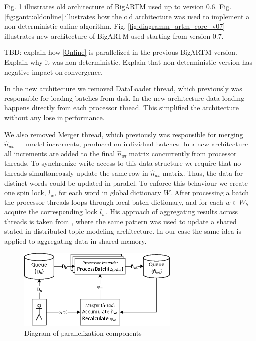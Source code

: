 \documentclass[russian,english]{llncs}
\begin{document}
Fig. \ref{fig:diagramm_artm_core} illustrates old architecture of BigARTM used up to version 0.6.
Fig. \ref{fig:gantt:oldonline} illustrates how the old architecture was used to implement a non-deterministic online algorithm.
Fig. \ref{fig:diagramm_artm_core_v07} illustrates new architecture of BigARTM used starting from version 0.7.


TBD: explain how \ref{Online} is parallelized in the previous BigARTM version.
Explain why it was non-deterministic.
Explain that non-deterministic version has negative impact on convergence.

In the new architecture we removed DataLoader thread,
which previously was responsible for loading batches from disk.
In the new architecture data loading happens directly from each processor thread.
This simplified the architecture without any lose in performance.

We also removed Merger thread, which previously was responsible
for merging $\hat n_{wt}$ --- model increments, produced on individual batches.
In a new architecture all increments are added to the final $\hat n_{wt}$ matrix
concurrently from processor threads.
To synchronize write access to this data structure we require that
no threads simultaneously update the same row in $\hat n_{wt}$ matrix.
Thus, the data for distinct words could be updated in parallel.
To enforce this behaviour we create one spin lock, $l_w$, for each word in global dictionary $W$.
After processing a batch the processor threads loops through local batch dictionary,
and for each $w \in W_b$ acquire the corresponding lock $l_w$.
His approach of aggregating results across threads is taken from \cite{smola10architecture},
where the same pattern was used to update a shared stated in distributed topic modeling architecture.
In our case the same idea is applied to aggregating data in shared memory.

\begin{figure}[t]
\begin{centering}
\includegraphics[height=39mm]{diagramm_artm_core.eps}
\caption{Diagram of parallelization components}
\label{fig:diagramm_artm_core}
\end{centering}
\end{figure}
\end{document}
